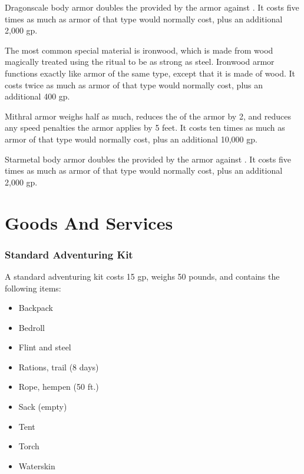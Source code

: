          Dragonscale body armor doubles the  provided by the armor against .
        It costs five times as much as armor of that type would normally cost, plus an additional 2,000 gp.

         The most common special material is ironwood, which is made from wood magically treated using the  ritual to be as strong as steel. Ironwood armor functions exactly like  armor of the same type, except that it is made of wood.
        It costs twice as much as armor of that type would normally cost, plus an additional 400 gp.

         Mithral armor weighs half as much, reduces the  of the armor by 2, and reduces any speed penalties the armor applies by 5 feet.
        It costs ten times as much as armor of that type would normally cost, plus an additional 10,000 gp.

         Starmetal body armor doubles the  provided by the armor against .
        It costs five times as much as armor of that type would normally cost, plus an additional 2,000 gp.

\section{Goods And Services}

    \subsubsection{Standard Adventuring Kit}
        A standard adventuring kit costs 15 gp, weighs 50 pounds, and contains the following items:
        \begin{itemize}
            \item Backpack
            \item Bedroll
            \item Flint and steel
            \item Rations, trail (8 days)
            \item Rope, hempen (50 ft.)
            \item Sack (empty)
            \item Tent
            \item Torch
            \item Waterskin
        \end{itemize}

